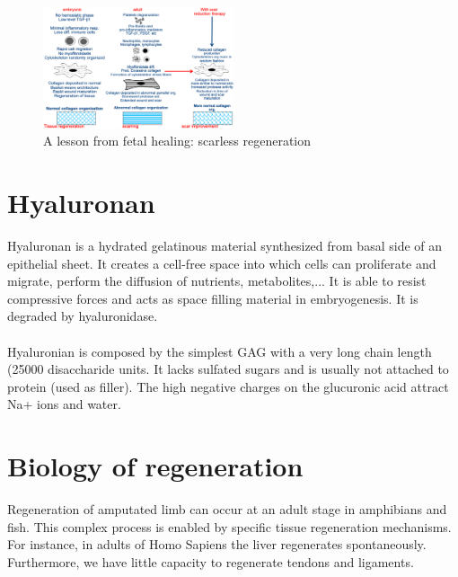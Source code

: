 \begin{figure}[h]
\centering
\includegraphics[width=0.5\textwidth]{scar.png}
\caption{\label{fig:scar}A lesson from fetal healing: scarless regeneration}
\end{figure}

\section{Hyaluronan}
Hyaluronan is a hydrated gelatinous material	synthesized from basal side of an epithelial sheet.
It creates a cell-free space into which cells can proliferate and migrate, perform the diffusion of nutrients, metabolites,...
It is able to resist compressive forces and acts as space filling material in embryogenesis.
It is degraded by hyaluronidase.
\\
\\
\noindent
Hyaluronian is composed by the simplest GAG with a very long chain length (25000 disaccharide units. It lacks sulfated sugars and is usually not attached to protein (used as filler). The high negative charges on the glucuronic acid attract Na+ ions and water.


\section{Biology of regeneration}
Regeneration of amputated limb can occur at an adult stage in amphibians and fish.
This complex process is enabled by specific tissue regeneration mechanisms.
For instance,  in adults of Homo Sapiens the liver regenerates spontaneously.
Furthermore, we have little capacity to regenerate tendons and ligaments.
